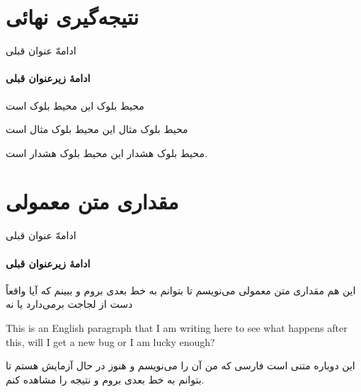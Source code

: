 \documentclass{beamer}
\begin{document}
\section{نتیجه‌گیری نهائی}
\begin{frame}{ادامهّ عنوان قبلی}
\framesubtitle{ادامهٔ زیرعنوان قبلی}
\begin{بلوک}{محیط بلوک}
این محیط بلوک است
\end{بلوک}
\begin{بلوک‌مثال}{محیط بلوک مثال}
این محیط بلوک مثال است
\end{بلوک‌مثال}
\begin{بلوک‌هشدار}{محیط بلوک هشدار}
این محیط بلوک هشدار است.
\end{بلوک‌هشدار}
\end{frame}
\section{مقداری متن معمولی}
\begin{frame}{ادامهّ عنوان قبلی}
\framesubtitle{ادامهٔ زیرعنوان قبلی}
این هم مقداری متن معمولی می‌نویسم تا بتوانم به خط بعدی بروم و ببینم که آیا واقعاً  دست از لجاجت برمی‌دارد یا نه
\begin{roman}
This is an English paragraph that I am writing here to see what happens after this, will I get a new bug or I am lucky enough?
\end{roman}
این دوباره متنی است فارسی که من آن را می‌نویسم و هنوز در حال آزمایش هستم تا بتوانم به خط بعدی بروم و نتیجه را مشاهده کنم.
\end{frame}
\end{document}
